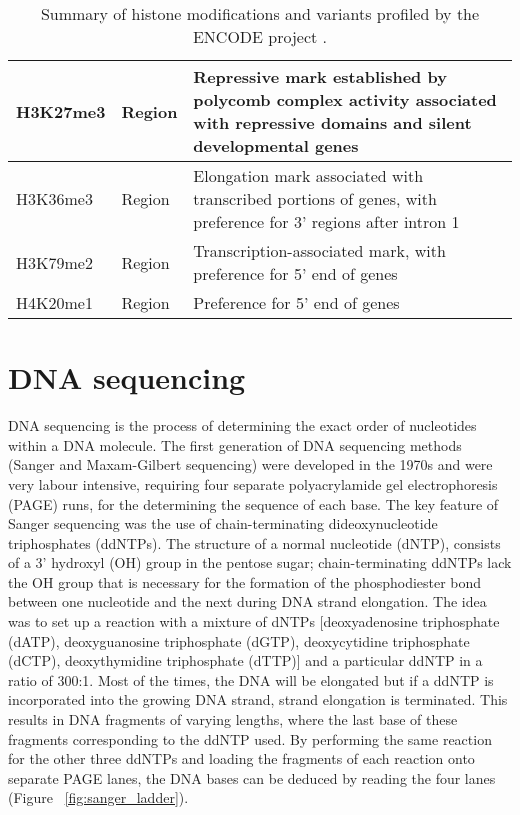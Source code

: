 \begin{table}[h]
\begin{tabular}{l l p{5cm}}
H3K27me3                        & Region                 & Repressive mark established by polycomb complex activity associated with repressive domains and silent developmental genes            \\ \hline
H3K36me3                        & Region                 & Elongation mark associated with transcribed portions of genes, with preference for 3' regions after intron 1                          \\ \hline
H3K79me2                        & Region                 & Transcription-associated mark, with preference for 5' end of genes                                                                    \\ \hline
H4K20me1                        & Region                 & Preference for 5' end of genes                                                                                                       
   \end{tabular}
   \caption[Table of histone modifications]{Summary of histone modifications and variants profiled by the ENCODE project \citep{pmid22955616}.}
   \label{table:histone_mod}
\end{table}

\section{DNA sequencing}

DNA sequencing is the process of determining the exact order of nucleotides within a DNA molecule. The first generation of DNA sequencing methods (Sanger and Maxam-Gilbert sequencing) were developed in the 1970s and were very labour intensive, requiring four separate polyacrylamide gel electrophoresis (PAGE) runs, for the determining the sequence of each base. The key feature of Sanger sequencing  \citep{pmid271968} was the use of chain-terminating dideoxynucleotide triphosphates (ddNTPs). The structure of a normal nucleotide (dNTP), consists of a 3' hydroxyl (OH) group in the pentose sugar; chain-terminating ddNTPs lack the OH group that is necessary for the formation of the phosphodiester bond between one nucleotide and the next during DNA strand elongation. The idea was to set up a reaction with a mixture of dNTPs [deoxyadenosine triphosphate (dATP), deoxyguanosine triphosphate (dGTP), deoxycytidine triphosphate (dCTP), deoxythymidine triphosphate (dTTP)] and a particular ddNTP in a ratio of 300:1. Most of the times, the DNA will be elongated but if a ddNTP is incorporated into the growing DNA strand, strand elongation is terminated. This results in DNA fragments of varying lengths, where the last base of these fragments corresponding to the ddNTP used. By performing the same reaction for the other three ddNTPs and loading the fragments of each reaction onto separate PAGE lanes, the DNA bases can be deduced by reading the four lanes (Figure ~\ref{fig:sanger_ladder}).

